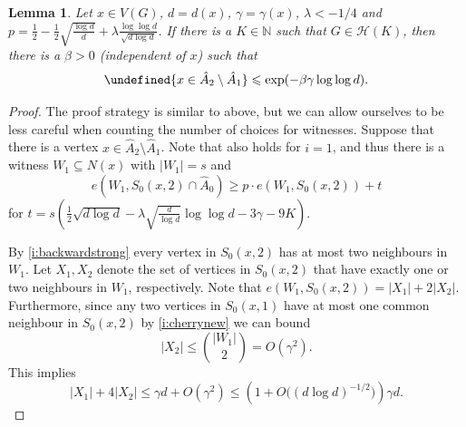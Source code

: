 \documentclass[reqno,a4paper,11pt]{amsart}
\newtheorem{lemma}[theorem]{Lemma}
\theoremstyle{definition}
\renewcommand{\leq}{\leqslant}
\renewcommand{\geq}{\geqslant}
\let\Pr\undefined
\begin{document}
\begin{lemma}\label{l:xinA2-A1}
  Let $x \in V(G)$, $d=d(x)$, $\gamma=\gamma(x)$, $\lambda < -1/4$ and $p = \frac{1}{2}-\frac{1}{2} \sqrt{\frac{\log d}{d}} + \lambda \frac{\log \log d}{\sqrt{d \log d}}$.
  If there is a $K \in \mathbb{N}$ such that $G \in \mathcal{H}(K)$, then there is a $\beta >0$ (independent of $x$) such that
  \[
    \Pr{x \in \hat{A}_2 \setminus \hat{A}_1} \leq \exp(-\beta \gamma \log \log d).
  \]
\end{lemma}

\begin{proof}
  The proof strategy is similar to above, but we can allow ourselves to be less careful when counting the number of choices for witnesses.
  Suppose that there is a vertex $x \in \hat{A}_2\setminus \hat{A}_1$.
  Note that  also holds for $i=1$, and thus there is a witness $W_1 \subseteq N(x)$ with $|W_1|=s$ and
  \[
    e(W_1, S_0(x, 2) \cap \hat{A}_0) \geq p \cdot e(W_1, S_0(x, 2)) +t
  \]
  for $t=s\left(\frac{1}{2} \sqrt{d \log d} - \lambda \sqrt{\frac{d}{\log d}} \log \log d - 3 \gamma -9K\right)$.

  By \ref{i:backwardstrong} every vertex in $S_0(x, 2)$ has at most two neighbours in $W_1$.
  Let $X_1, X_2$ denote the set of vertices in $S_0(x, 2)$ that have exactly one or two neighbours in $W_1$, respectively.
  Note that $e(W_1, S_0(x, 2))= |X_1| + 2 |X_2|$.
  Furthermore, since any two vertices in $S_0(x, 1)$ have at most one common neighbour in $S_0(x, 2)$ by \ref{i:cherrynew} we can bound
  \[
    |X_2| \leq \binom{|W_1|}{2} =O(\gamma^2).
  \]
  This implies
  \[
    |X_1| + 4 |X_2| \leq \gamma d + O(\gamma^2) \leq \left(1+O\big((d \log d)^{-1/2}\big)\right) \gamma d.
  \]


\end{proof}
\end{document}
